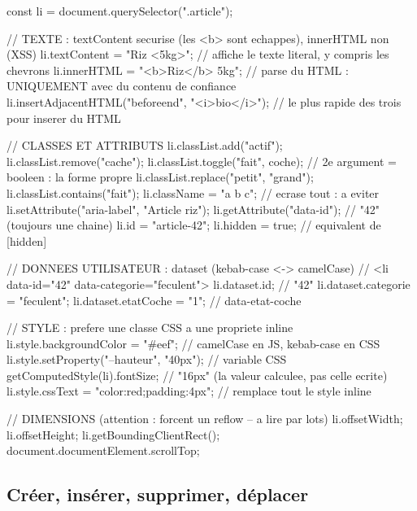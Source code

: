 \documentclass[12pt,a4paper,twoside,openright]{book}
\begin{document}
\begin{codejs}
const li = document.querySelector(".article");

// TEXTE : textContent securise (les <b> sont echappes), innerHTML non (XSS)
li.textContent = "Riz <5kg>";              // affiche le texte literal, y compris les chevrons
li.innerHTML = "<b>Riz</b> 5kg";           // parse du HTML : UNIQUEMENT avec du contenu de confiance
li.insertAdjacentHTML("beforeend", "<i>bio</i>");  // le plus rapide des trois pour inserer du HTML

// CLASSES ET ATTRIBUTS
li.classList.add("actif"); li.classList.remove("cache");
li.classList.toggle("fait", coche);         // 2e argument = booleen : la forme propre
li.classList.replace("petit", "grand");
li.classList.contains("fait");
li.className = "a b c";                     // ecrase tout : a eviter
li.setAttribute("aria-label", "Article riz");
li.getAttribute("data-id");                 // "42" (toujours une chaine)
li.id = "article-42";
li.hidden = true;                           // equivalent de [hidden]

// DONNEES UTILISATEUR : dataset (kebab-case <-> camelCase)
// <li data-id="42" data-categorie="feculent">
li.dataset.id;                // "42"
li.dataset.categorie = "feculent";
li.dataset.etatCoche = "1";   // data-etat-coche

// STYLE : prefere une classe CSS a une propriete inline
li.style.backgroundColor = "#eef";          // camelCase en JS, kebab-case en CSS
li.style.setProperty("--hauteur", "40px");  // variable CSS
getComputedStyle(li).fontSize;              // "16px" (la valeur calculee, pas celle ecrite)
li.style.cssText = "color:red;padding:4px"; // remplace tout le style inline

// DIMENSIONS (attention : forcent un reflow -- a lire par lots)
li.offsetWidth; li.offsetHeight; li.getBoundingClientRect();
document.documentElement.scrollTop;
\end{codejs}

\subsection{Cr\'eer, ins\'erer, supprimer, d\'eplacer}
\end{document}
